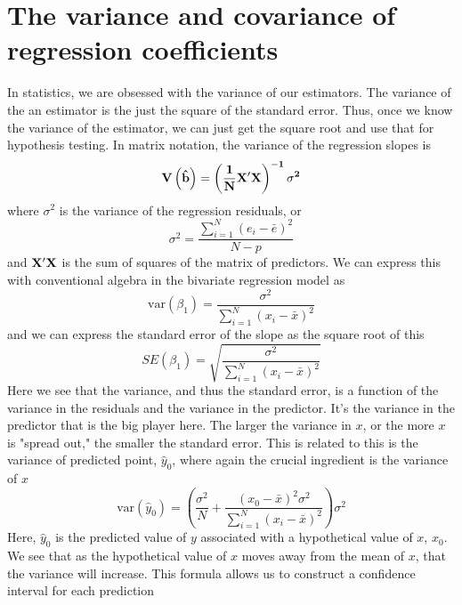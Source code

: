 \section{The variance and covariance of regression coefficients}
\label{sec:matrixv}
In statistics, we are obsessed with the variance of our estimators. The variance of the an estimator is the just the square of the standard error. Thus, once we know the variance of the estimator, we can just get the square root and use that for hypothesis testing. In matrix notation, the variance of the regression slopes is
\begin{equation}
\bf V\left({\hat{b}}\right)=\left(\frac{1}{N}X'X\right)^{-1}\sigma^2
\end{equation}
where $\sigma^2$ is the variance of the regression residuals, or
\begin{equation}
\sigma^2 = \frac{\sum_{i=1}^N\left(e_i-\bar{e}\right)^2}{N-p}
\end{equation}
and $\bf X'X$ is the sum of squares of the matrix of predictors. We can express this with conventional algebra in the bivariate regression model as
\begin{equation}\label{eq:olsb1var}
\mbox{var}\left(\beta_1\right)=\frac{\sigma^2}{\sum_{i=1}^N\left(x_i-\bar{x}\right)^2}
\end{equation}
and we can express the standard error of the slope as the square root of this
\begin{equation}
SE\left(\beta_1\right)=\sqrt{\frac{\sigma^2}{\sum_{i=1}^N\left(x_i-\bar{x}\right)^2}}
\end{equation}
Here we see that the variance, and thus the standard error, is a function of the variance in the residuals and the variance in the predictor. It's the variance in the predictor that is the big player here. The larger the variance in $x$, or the more $x$ is "spread out," the smaller the standard error.
This is related to this is the variance of predicted point, $\hat{y}_0$, where again the crucial ingredient is the variance of $x$
\begin{equation}\label{eq:varfit}
\mbox{var}\left(\hat{y}_0\right)=\left(\frac{\sigma^2}{N}+\frac{\left(x_0-\bar{x}\right)^2\sigma^2}{\sum_{i=1}^N\left(x_i-\bar{x}\right)^2}\right)\sigma^2
\end{equation}
Here, $\hat{y}_0$ is the predicted value of $y$ associated with a hypothetical value of $x$, $x_0$. We see that as the hypothetical value of $x$ moves away from the mean of $x$, that the variance will increase.  This formula allows us to construct a confidence interval for each prediction
